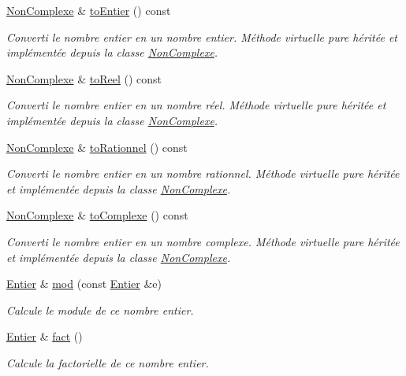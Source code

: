 \begin{DoxyCompactItemize}
\hyperlink{classNonComplexe}{\-Non\-Complexe} \& \hyperlink{classEntier_a0d34eb382eb7329b16552d191592ed27}{to\-Entier} () const 
\begin{DoxyCompactList}\small\item\em \-Converti le nombre entier en un nombre entier. \-Méthode virtuelle pure héritée et implémentée depuis la classe \hyperlink{classNonComplexe}{\-Non\-Complexe}. \end{DoxyCompactList}\item 
\hyperlink{classNonComplexe}{\-Non\-Complexe} \& \hyperlink{classEntier_a8ac645f157658a958ec4b46f9f60d3cd}{to\-Reel} () const 
\begin{DoxyCompactList}\small\item\em \-Converti le nombre entier en un nombre réel. \-Méthode virtuelle pure héritée et implémentée depuis la classe \hyperlink{classNonComplexe}{\-Non\-Complexe}. \end{DoxyCompactList}\item 
\hyperlink{classNonComplexe}{\-Non\-Complexe} \& \hyperlink{classEntier_a7a7e540ab2ea666819e6f916ed6617de}{to\-Rationnel} () const 
\begin{DoxyCompactList}\small\item\em \-Converti le nombre entier en un nombre rationnel. \-Méthode virtuelle pure héritée et implémentée depuis la classe \hyperlink{classNonComplexe}{\-Non\-Complexe}. \end{DoxyCompactList}\item 
\hyperlink{classNonComplexe}{\-Non\-Complexe} \& \hyperlink{classEntier_a33148f1d942abe9f810542ae8b71e653}{to\-Complexe} () const 
\begin{DoxyCompactList}\small\item\em \-Converti le nombre entier en un nombre complexe. \-Méthode virtuelle pure héritée et implémentée depuis la classe \hyperlink{classNonComplexe}{\-Non\-Complexe}. \end{DoxyCompactList}\item 
\hyperlink{classEntier}{\-Entier} \& \hyperlink{classEntier_a79059e2d7c89d2e27a6fba79efb392d1}{mod} (const \hyperlink{classEntier}{\-Entier} \&e)
\begin{DoxyCompactList}\small\item\em \-Calcule le module de ce nombre entier. \end{DoxyCompactList}\item 
\hyperlink{classEntier}{\-Entier} \& \hyperlink{classEntier_af330a9378ef16e9e5381bf0d0a97d443}{fact} ()
\begin{DoxyCompactList}\small\item\em \-Calcule la factorielle de ce nombre entier. \end{DoxyCompactList}\item 

\end{DoxyCompactItemize}
